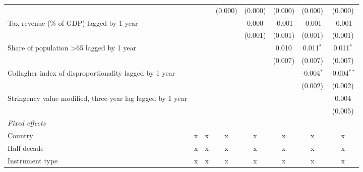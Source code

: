 \begin{tabular}{lccccccc}
                                                                                &         &         & (0.000)      & (0.000)       & (0.000)     & (0.000)      & (0.000)\\   
   Tax revenue (\% of GDP) lagged by 1 year                                     &         &         &              & 0.000         & -0.001      & -0.001       & -0.001\\   
                                                                                &         &         &              & (0.001)       & (0.001)     & (0.001)      & (0.001)\\   
   Share of population >65 lagged by 1 year                                     &         &         &              &               & 0.010       & 0.011$^{*}$  & 0.011$^{*}$\\   
                                                                                &         &         &              &               & (0.007)     & (0.007)      & (0.007)\\   
   Gallagher index of disproportionality lagged by 1 year                       &         &         &              &               &             & -0.004$^{*}$ & -0.004$^{**}$\\   
                                                                                &         &         &              &               &             & (0.002)      & (0.002)\\   
   Stringency value modified, three-year lag lagged by 1 year                   &         &         &              &               &             &              & 0.004\\   
                                                                                &         &         &              &               &             &              & (0.005)\\   
   \emph{Fixed effects}\\
   Country                                                                      & x       & x       & x            & x             & x           & x            & x\\  
   Half decade                                                                  & x       & x       & x            & x             & x           & x            & x\\  
   Instrument type                                                              & x       & x       & x            & x             & x           & x            & x\\  

\end{tabular}
